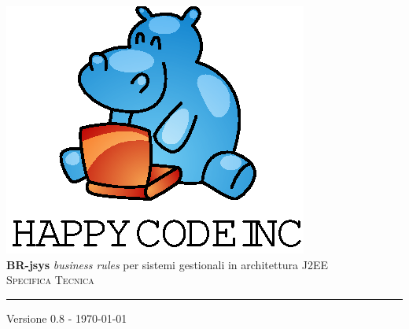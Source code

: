 \documentclass[11pt,titlepage,a4paper]{report}
\begin{document}
\newcommand{\lv}{ 0.8 } %
\newcommand{\dt}{ Specifica Tecnica }%
\newcommand{\Glossario}{ Glossario.1.4.pdf }
\newcommand{\PdQ}{ PianoDiQualifica.1.1.pdf }
\newcommand{\PdP}{ PianoDiProgetto.1.1.pdf }

\newcommand{\br}{business rule }
\newcommand{\brs}{business rules }
\newcommand{\bo}{business object }
\newcommand{\bos}{business objects }
\newcommand{\re}{repository }
\newcommand{\brp}{BusinessRuleParser }
\newcommand{\brl}{BusinessRuleLexer }
\newcommand{\BR}{BusinessRule }



\begin{titlepage}\begin{center}
\vspace*{0.5in}
\includegraphics{logo.eps}
\vspace*{0.2in} \\
{\Large \textbf{BR-jsys}}
{\Large \emph{business rules} per sistemi gestionali in architettura J2EE } 
\vspace{2in} \\
\Huge \textsc{ \dt }
\par\rule{10cm}{0.4pt} \par {\large Versione \lv - \today} \\
\end{center}\end{titlepage}
\vspace*{0.5in}
\end{document}
